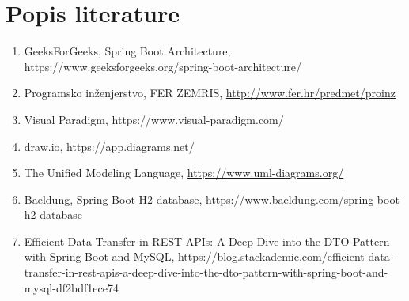 \chapter*{Popis literature}
		
		\begin{enumerate}
			
			\item GeeksForGeeks, Spring Boot Architecture, https://www.geeksforgeeks.org/spring-boot-architecture/
			
			\item  Programsko inženjerstvo, FER ZEMRIS, \url{http://www.fer.hr/predmet/proinz}
			
			\item Visual Paradigm, https://www.visual-paradigm.com/
			
			\item draw.io, https://app.diagrams.net/
			
			\item  The Unified Modeling Language, \url{https://www.uml-diagrams.org/}
			
			\item Baeldung, Spring Boot H2 database, https://www.baeldung.com/spring-boot-h2-database
			
			\item Efficient Data Transfer in REST APIs: A Deep Dive into the DTO Pattern with Spring Boot and MySQL, https://blog.stackademic.com/efficient-data-transfer-in-rest-apis-a-deep-dive-into-the-dto-pattern-with-spring-boot-and-mysql-df2bdf1ece74
			
		\end{enumerate}
		
		 